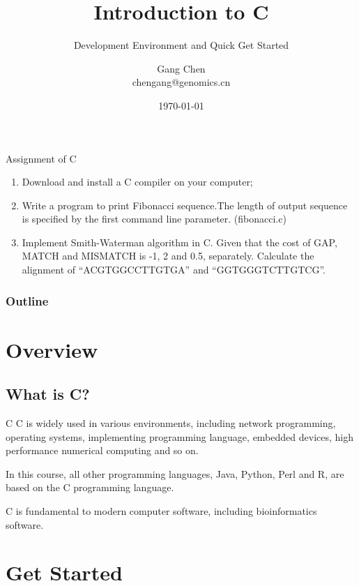 \documentclass[UTF8]{beamer}
\title{Introduction to C}
\subtitle{Development Environment and Quick Get Started}
\author{Gang Chen\\ chengang@genomics.cn}
\date{\today}
\begin{document}
\begin{frame}
\titlepage
\end{frame}

\begin{frame}[t]{Assignment of C}
\begin{enumerate}
    \item Download and install a C compiler on your computer;
    \item Write a program to print Fibonacci sequence.The length of output sequence is specified by the first command line parameter. (fibonacci.c)
    \item Implement Smith-Waterman algorithm in C. Given that the cost of GAP, MATCH and MISMATCH is -1, 2 and 0.5, separately. Calculate the alignment of “ACGTGGCCTTGTGA” and “GGTGGGTCTTGTCG”.
\end{enumerate}


\end{frame}

\begin{frame}[t]\frametitle{Outline}
\tableofcontents[hideallsubsections]
\end{frame}

\section{Overview}
\subsection{What is C?}
\begin{frame}[t]{C}
C is widely used in various environments, including network programming, operating systems, implementing programming language, embedded devices, high performance numerical computing and so on.

In this course, all other programming languages, Java, Python, Perl and R, are based on the C programming language.

C is fundamental to modern computer software, including bioinformatics software.

\end{frame}


\section{Get Started}
\end{document}
